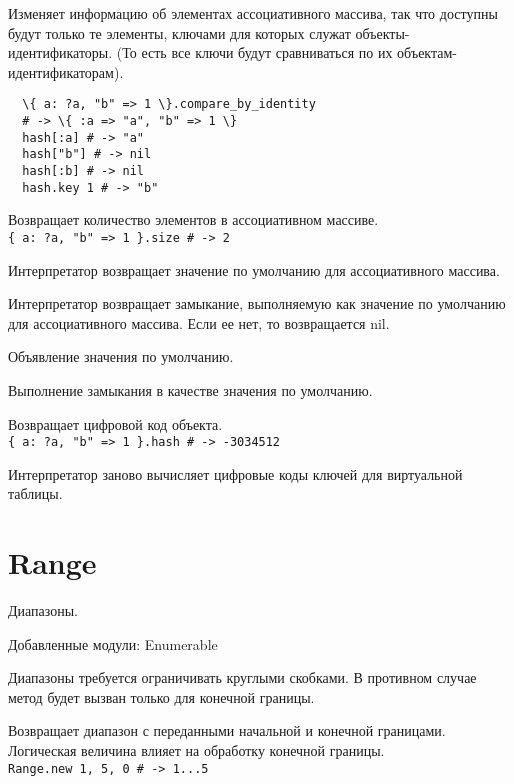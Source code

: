 \begin{methodlist}
  Изменяет информацию об элементах ассоциативного массива, так что доступны будут только те элементы, ключами для которых служат объекты-идентификаторы. (То есть все ключи будут сравниваться по их объектам-идентификаторам). 
  \begin{verbatim}
  \{ a: ?a, "b" => 1 \}.compare_by_identity
  # -> \{ :a => "a", "b" => 1 \} 
  hash[:a] # -> "a" 
  hash["b"] # -> nil
  hash[:b] # -> nil
  hash.key 1 # -> "b"
  \end{verbatim}

  Возвращает количество элементов в ассоциативном массиве. 
  \\\verb!{ a: ?a, "b" => 1 }.size # -> 2!

  Интерпретатор возвращает значение по умолчанию для ассоциативного массива. 
 
  Интерпретатор возвращает замыкание, выполняемую как значение по умолчанию для ассоциативного массива. Если ее нет, то возвращается nil.

  Объявление значения по умолчанию. 
 
  Выполнение замыкания в качестве значения по умолчанию.

  Возвращает цифровой код объекта. 
  \\\verb!{ a: ?a, "b" => 1 }.hash # -> -3034512!
 
  Интерпретатор заново вычисляет цифровые коды ключей для виртуальной таблицы.
\end{methodlist}

\section{Range} 

Диапазоны.

Добавленные модули: Enumerable 

Диапазоны требуется ограничивать круглыми скобками. В противном случае метод будет вызван только для конечной границы.

\begin{methodlist}
  Возвращает диапазон с переданными начальной и конечной границами. Логическая величина влияет на обработку конечной границы.
  \\\verb!Range.new 1, 5, 0 # -> 1...5!
\end{methodlist}


